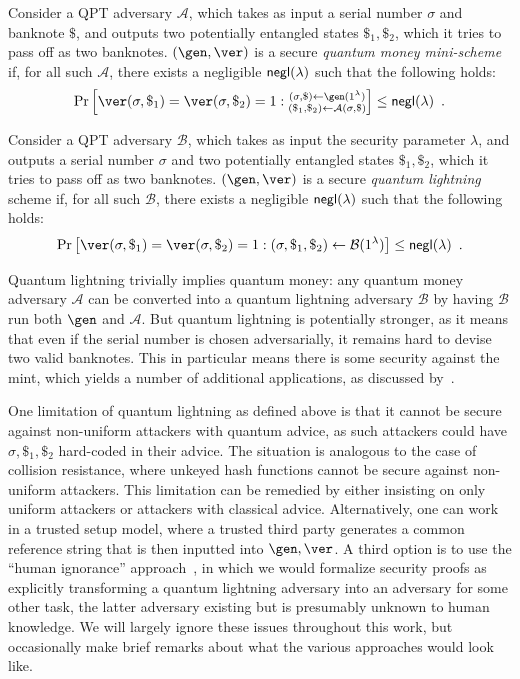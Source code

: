 \documentclass{article}\usepackage[a4paper,margin=20mm]{geometry}
\numberwithin{theorem}{section}
\numberwithin{equation}{section}
\newcommand{\As}{{\mathcal{A}}}
\newcommand{\Bs}{{\mathcal{B}}}
\newcommand{\negl}{{\sf negl}}
\begin{document}
\begin{definition}Consider a QPT adversary $\As$, which takes as input a serial number $\sigma$ and banknote $\$$, and outputs two potentially entangled states $\$_1,\$_2$, which it tries to pass off as two banknotes. $(\gen,\ver)$ is a secure \emph{quantum money mini-scheme} if, for all such $\As$, there exists a negligible $\negl(\lambda)$ such that the following holds:
	\[\Pr\left[\ver(\sigma,\$_1)=\ver(\sigma,\$_2)=1:\substack{(\sigma,\$)\gets\gen(1^\lambda)\\(\$_1,\$_2)\gets\As(\sigma,\$)}\right]\leq\negl(\lambda)\enspace .\]
\end{definition}
\begin{definition}Consider a QPT adversary $\Bs$, which takes as input the security parameter $\lambda$, and outputs a serial number $\sigma$ and two potentially entangled states $\$_1,\$_2$, which it tries to pass off as two banknotes. $(\gen,\ver)$ is a secure \emph{quantum lightning} scheme if, for all such $\Bs$, there exists a negligible $\negl(\lambda)$ such that the following holds:
	\[\Pr\left[\ver(\sigma,\$_1)=\ver(\sigma,\$_2)=1:(\sigma,\$_1,\$_2)\gets\Bs(1^\lambda)\right]\leq\negl(\lambda)\enspace .\]
\end{definition}
Quantum lightning trivially implies quantum money: any quantum money adversary $\As$ can be converted into a quantum lightning adversary $\Bs$ by having $\Bs$ run both $\gen$ and $\As$. But quantum lightning is potentially stronger, as it means that even if the serial number is chosen adversarially, it remains hard to devise two valid banknotes. This in particular means there is some security against the mint, which yields a number of additional applications, as discussed by~\cite{DBLP:journals/joc/Zhandry21}.

\begin{remark}One limitation of quantum lightning as defined above is that it cannot be secure against non-uniform attackers with quantum advice, as such attackers could have $\sigma,\$_1,\$_2$ hard-coded in their advice. The situation is analogous to the case of collision resistance, where unkeyed hash functions cannot be secure against non-uniform attackers. This limitation can be remedied by either insisting on only uniform attackers or attackers with classical advice. Alternatively, one can work in a trusted setup model, where a trusted third party generates a common reference string that is then inputted into $\gen,\ver$. A third option is to use the ``human ignorance'' approach~\cite{VIETCRYPT:Rogaway06}, in which we would formalize security proofs as explicitly transforming a quantum lightning adversary into an adversary for some other task, the latter adversary existing but is presumably unknown to human knowledge. We will largely ignore these issues throughout this work, but occasionally make brief remarks about what the various approaches would look like.
\end{remark}
\end{document}
